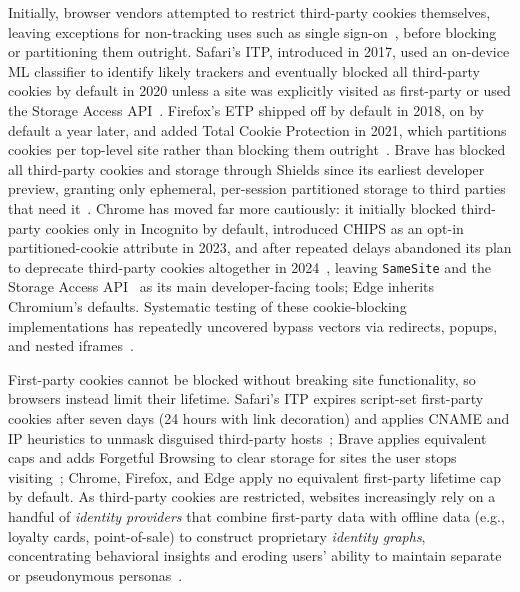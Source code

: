 %
Initially, browser vendors attempted to restrict third-party cookies themselves, leaving exceptions for non-tracking uses such as single sign-on~\cite{crouchImprovingPrivacyBreaking2018}, before blocking or partitioning them outright.
%
Safari's ITP, introduced in 2017, used an on-device ML classifier to identify likely trackers and eventually blocked all third-party cookies by default in 2020 unless a site was explicitly visited as first-party or used the Storage Access API~\cite{TrackingPreventionWebKit2020}.
%
Firefox's ETP shipped off by default in 2018, on by default a year later, and added Total Cookie Protection in 2021, which partitions cookies per top-level site rather than blocking them outright~\cite{mdnThirdpartyCookiesPrivacy2024}.
%
Brave has blocked all third-party cookies and storage through Shields since its earliest developer preview, granting only ephemeral, per-session partitioned storage to third parties that need it~\cite{braveprivacyteamEphemeralThirdpartySite2021}.
%
Chrome has moved far more cautiously: it initially blocked third-party cookies only in Incognito by default, introduced CHIPS as an opt-in partitioned-cookie attribute in 2023, and after repeated delays abandoned its plan to deprecate third-party cookies altogether in 2024~\cite{chavezNewPathPrivacy2024}, leaving \texttt{SameSite} and the Storage Access API~\cite{mdnStorageAccessAPI2024} as its main developer-facing tools; Edge inherits Chromium's defaults.
%
Systematic testing of these cookie-blocking implementations has repeatedly uncovered bypass vectors via redirects, popups, and nested iframes~\cite{frankenWhoLeftOpen2018}.


%
First-party cookies cannot be blocked without breaking site functionality, so browsers instead limit their lifetime.
%
Safari's ITP expires script-set first-party cookies after seven days (24 hours with link decoration) and applies CNAME and IP heuristics to unmask disguised third-party hosts~\cite{TrackingPreventionWebKit2020}; Brave applies equivalent caps and adds Forgetful Browsing to clear storage for sites the user stops visiting~\cite{bravePrivacyProtectionSecurity}; Chrome, Firefox, and Edge apply no equivalent first-party lifetime cap by default.
%
As third-party cookies are restricted, websites increasingly rely on a handful of \emph{identity providers} that combine first-party data with offline data (e.g., loyalty cards, point-of-sale) to construct proprietary \emph{identity graphs}, concentrating behavioral insights and eroding users' ability to maintain separate or pseudonymous personas~\cite{TargetedAdvertisingAutorite2025,munirGooglesChromeAntitrust2024}.

